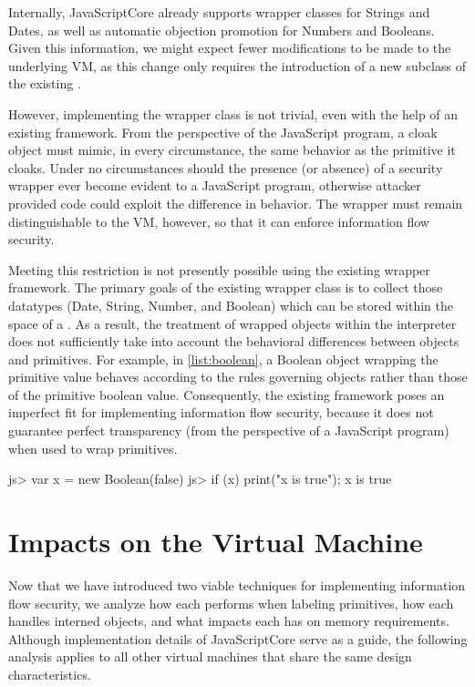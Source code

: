 Internally, JavaScriptCore already supports wrapper classes for Strings and Dates, as well as automatic objection promotion for Numbers and Booleans.
Given this information, we might expect fewer modifications to be made to the underlying VM, as this change only requires the introduction of a new subclass of the existing .

However, implementing the wrapper class is not trivial, even with the help of an existing framework.
From the perspective of the JavaScript program, a cloak object must mimic, in every circumstance, the same behavior as the primitive it cloaks.
Under no circumstances should the presence (or absence) of a security wrapper ever become evident to a JavaScript program, otherwise attacker provided code could exploit the difference in behavior.
The wrapper must remain distinguishable to the VM, however, so that it can enforce information flow security.

Meeting this restriction is not presently possible using the existing wrapper framework.
The primary goals of the existing wrapper class is to collect those datatypes (Date, String, Number, and Boolean) which can be stored within the space of a .
As a result, the treatment of wrapped objects within the interpreter does not sufficiently take into account the behavioral differences between objects and primitives.
For example, in \autoref{list:boolean}, a Boolean object wrapping the primitive value  behaves according to the rules governing objects rather than those of the primitive boolean value.
Consequently, the existing framework poses an imperfect fit for implementing information flow security, because it does not guarantee perfect transparency (from the perspective of a JavaScript program) when used to wrap primitives.

\begin{jscode}
js> var x = new Boolean(false)
js> if (x) { print("x is true"); }
    x is true
\end{jscode}

\section{Impacts on the Virtual Machine}
\label{sec:analysis}

Now that we have introduced two viable techniques for implementing information flow security, we analyze how each performs when labeling primitives, how each handles interned objects, and what impacts each has on memory requirements.
Although implementation details of JavaScriptCore serve as a guide, the following analysis applies to all other virtual machines that share the same design characteristics.

